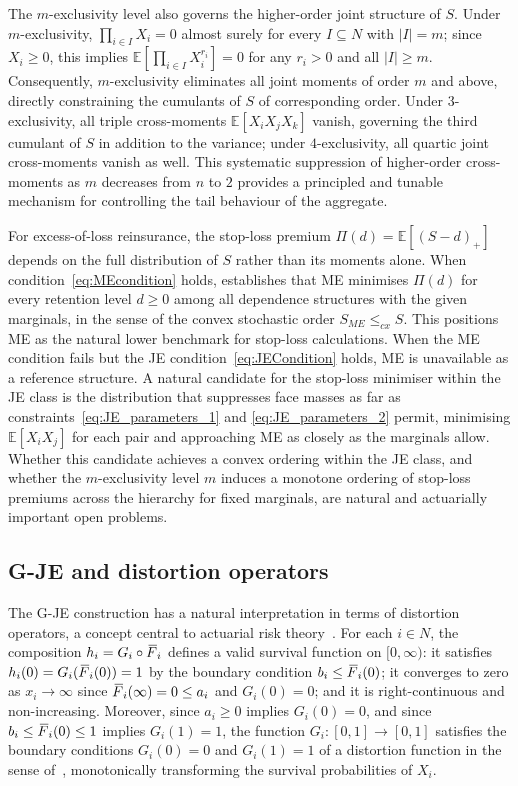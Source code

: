 \documentclass[letterpaper,12pt]{article}
\def \E {\mathbb{E}}
\numberwithin{equation}{section}
\newcommand{\N}{{N}}
\newcommand{\F}{\,\overline{\kern-0.175em F\kern-0em}}
\begin{document}
{The $m$-exclusivity level also governs the higher-order joint structure of
$S$. Under $m$-exclusivity, $\prod_{i\in I}X_i=0$ almost surely for every
$I\subseteq\N$ with $|I|=m$; since $X_i\ge0$, this implies
$\E[\prod_{i\in I}X_i^{r_i}]=0$ for any $r_i>0$ and all $|I|\ge m$.
Consequently, $m$-exclusivity eliminates all joint moments of order $m$ and
above, directly constraining the cumulants of $S$ of corresponding order.
Under $3$-exclusivity, all triple cross-moments $\E[X_iX_jX_k]$ vanish,
governing the third cumulant of $S$ in addition to the variance; under
$4$-exclusivity, all quartic joint cross-moments vanish as well. This
systematic suppression of higher-order cross-moments as $m$ decreases from
$n$ to $2$ provides a principled and tunable mechanism for controlling the
tail behaviour of the aggregate.

For excess-of-loss reinsurance, the stop-loss premium
$\Pi(d)=\E[(S-d)_+]$ depends on the full distribution of $S$ rather than
its moments alone. When condition~\eqref{eq:MEcondition} holds,
\cite{Cheung2014} establishes that ME minimises $\Pi(d)$ for every retention
level $d\ge0$ among all dependence structures with the given marginals, in
the sense of the convex stochastic order $S_{ME}\le_{cx}S$. This positions
ME as the natural lower benchmark for stop-loss calculations. When the ME
condition fails but the JE condition~\eqref{eq:JECondition} holds, ME is
unavailable as a reference structure. A natural candidate for the stop-loss
minimiser within the JE class is the distribution that suppresses face masses
as far as constraints~\eqref{eq:JE_parameters_1} and \eqref{eq:JE_parameters_2}
permit, minimising $\E[X_iX_j]$ for each pair and approaching ME as closely
as the marginals allow. Whether this candidate achieves a convex ordering
within the JE class, and whether the $m$-exclusivity level $m$ induces a
monotone ordering of stop-loss premiums across the hierarchy for fixed
marginals, are natural and actuarially important open problems.

\subsection{G-JE and distortion operators}
\label{subsec:distortion}

The G-JE construction has a natural interpretation in terms of distortion
operators, a concept central to actuarial risk theory~\citep{Wang1996}. For
each $i\in\N$, the composition $h_i=G_i\circ\F_i$ defines a valid
survival function on $[0,\infty)$: it satisfies $h_i(0)=G_i(\F_i(0))=1$
by the boundary condition $b_i\le\F_i(0)$; it converges to zero as
$x_i\to\infty$ since $\F_i(\infty)=0\le a_i$ and $G_i(0)=0$; and it is
right-continuous and non-increasing. Moreover, since $a_i\ge0$ implies
$G_i(0)=0$, and since $b_i\le\F_i(0)\le1$ implies $G_i(1)=1$, the
function $G_i:[0,1]\to[0,1]$ satisfies the boundary conditions
$G_i(0)=0$ and $G_i(1)=1$ of a distortion function in the sense
of~\cite{Wang1996}, monotonically transforming the survival probabilities of
$X_i$.

}
\end{document}
